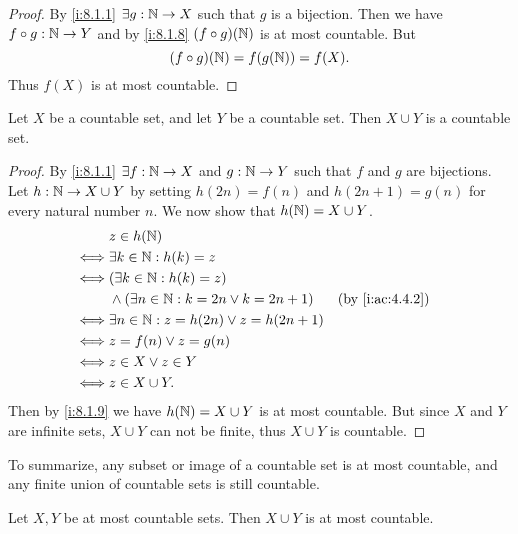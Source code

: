 \begin{proof}
  By \cref{i:8.1.1} \(\exists g : \mathbb{N} \to X\) such that \(g\) is a bijection.
  Then we have \(f \circ g : \mathbb{N} \to Y\) and by \cref{i:8.1.8} \((f \circ g)(\mathbb{N})\) is at most countable.
  But
  \[
    (f \circ g)(\mathbb{N}) = f(g(\mathbb{N})) = f(X).
  \]
  Thus \(f(X)\) is at most countable.
\end{proof}

\begin{prop}\label{i:8.1.10}
  Let \(X\) be a countable set, and let \(Y\) be a countable set.
  Then \(X \cup Y\) is a countable set.
\end{prop}

\begin{proof}
  By \cref{i:8.1.1} \(\exists f : \mathbb{N} \to X\) and \(g : \mathbb{N} \to Y\) such that \(f\) and \(g\) are bijections.
  Let \(h : \mathbb{N} \to X \cup Y\) by setting \(h(2n) = f(n)\) and \(h(2n + 1) = g(n)\) for every natural number \(n\).
  We now show that \(h(\mathbb{N}) = X \cup Y\).
  \begin{align*}
         & z \in h(\N)                                                            \\
    \iff & \exists k \in \N : h(k) = z                                            \\
    \iff & (\exists k \in \N : h(k) = z)                                          \\
         & \land (\exists n \in \N : k = 2n \lor k = 2n + 1) &  & \by{i:ac:4.4.2} \\
    \iff & \exists n \in \N : z = h(2n) \lor z = h(2n + 1)                        \\
    \iff & z = f(n) \lor z = g(n)                                                 \\
    \iff & z \in X \lor z \in Y                                                   \\
    \iff & z \in X \cup Y.
  \end{align*}
  Then by \cref{i:8.1.9} we have \(h(\mathbb{N}) = X \cup Y\) is at most countable.
  But since \(X\) and \(Y\) are infinite sets, \(X \cup Y\) can not be finite, thus \(X \cup Y\) is countable.
\end{proof}

\begin{note}
  To summarize, any subset or image of a countable set is at most countable, and any finite union of countable sets is still countable.
\end{note}

\begin{ac}\label{i:ac:8.1.1}
  Let \(X, Y\) be at most countable sets.
  Then \(X \cup Y\) is at most countable.
\end{ac}

